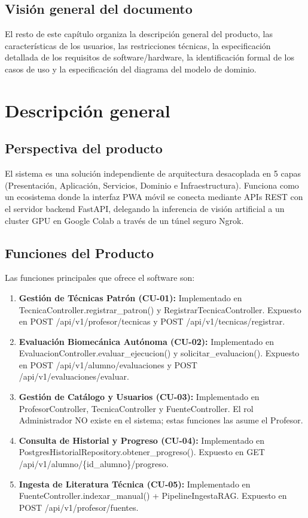 \subsection{Visión general del documento}
El resto de este capítulo organiza la descripción general del producto, las características de los usuarios, las restricciones técnicas, la especificación detallada de los requisitos de software/hardware, la identificación formal de los casos de uso y la especificación del diagrama del modelo de dominio.

\newpage

\section{Descripción general}

\subsection{Perspectiva del producto}
El sistema es una solución independiente de arquitectura desacoplada en 5 capas (Presentación, Aplicación, Servicios, Dominio e Infraestructura). Funciona como un ecosistema donde la interfaz PWA móvil se conecta mediante APIs REST con el servidor backend FastAPI, delegando la inferencia de visión artificial a un cluster GPU en Google Colab a través de un túnel seguro Ngrok.

\subsection{Funciones del Producto}
Las funciones principales que ofrece el software son:
\begin{enumerate}
    \item \textbf{Gestión de Técnicas Patrón (CU-01):} Implementado en TecnicaController.registrar\_patron() y RegistrarTecnicaController. Expuesto en POST /api/v1/profesor/tecnicas y POST /api/v1/tecnicas/registrar.
    \item \textbf{Evaluación Biomecánica Autónoma (CU-02):} Implementado en EvaluacionController.evaluar\_ejecucion() y solicitar\_evaluacion(). Expuesto en POST /api/v1/alumno/evaluaciones y POST /api/v1/evaluaciones/evaluar.
    \item \textbf{Gestión de Catálogo y Usuarios (CU-03):} Implementado en ProfesorController, TecnicaController y FuenteController. El rol Administrador NO existe en el sistema; estas funciones las asume el Profesor.
    \item \textbf{Consulta de Historial y Progreso (CU-04):} Implementado en PostgresHistorialRepository.obtener\_progreso(). Expuesto en GET /api/v1/alumno/\{id\_alumno\}/progreso.
    \item \textbf{Ingesta de Literatura Técnica (CU-05):} Implementado en FuenteController.indexar\_manual() + PipelineIngestaRAG. Expuesto en POST /api/v1/profesor/fuentes.
\end{enumerate}

